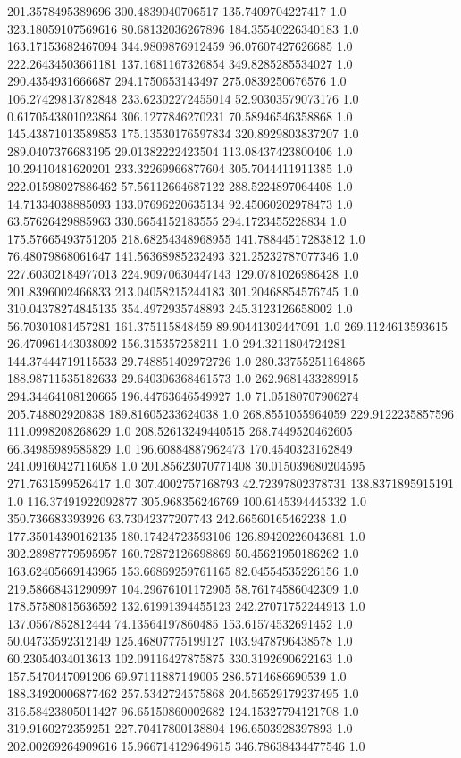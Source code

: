 201.3578495389696	300.4839040706517	135.7409704227417	1.0
323.18059107569616	80.68132036267896	184.35540226340183	1.0
163.17153682467094	344.9809876912459	96.07607427626685	1.0
222.26434503661181	137.1681167326854	349.8285285534027	1.0
290.4354931666687	294.1750653143497	275.0839250676576	1.0
106.27429813782848	233.62302272455014	52.90303579073176	1.0
0.6170543801023864	306.1277846270231	70.58946546358868	1.0
145.43871013589853	175.13530176597834	320.8929803837207	1.0
289.0407376683195	29.01382222423504	113.08437423800406	1.0
10.29410481620201	233.32269966877604	305.7044411911385	1.0
222.01598027886462	57.56112664687122	288.5224897064408	1.0
14.71334038885093	133.07696220635134	92.45060202978473	1.0
63.57626429885963	330.6654152183555	294.1723455228834	1.0
175.57665493751205	218.68254348968955	141.78844517283812	1.0
76.48079868061647	141.56368985232493	321.25232787077346	1.0
227.60302184977013	224.90970630447143	129.0781026986428	1.0
201.8396002466833	213.04058215244183	301.20468854576745	1.0
310.04378274845135	354.4972935748893	245.3123126658002	1.0
56.70301081457281	161.375115848459	89.90441302447091	1.0
269.1124613593615	26.470961443038092	156.315357258211	1.0
294.3211804724281	144.37444719115533	29.748851402972726	1.0
280.33755251164865	188.98711535182633	29.640306368461573	1.0
262.9681433289915	294.34464108120665	196.44763646549927	1.0
71.05180707906274	205.748802920838	189.81605233624038	1.0
268.8551055964059	229.9122235857596	111.0998208268629	1.0
208.52613249440515	268.7449520462605	66.34985989585829	1.0
196.60884887962473	170.4540323162849	241.09160427116058	1.0
201.85623070771408	30.015039680204595	271.7631599526417	1.0
307.4002757168793	42.72397802378731	138.8371895915191	1.0
116.37491922092877	305.968356246769	100.6145394445332	1.0
350.736683393926	63.73042377207743	242.66560165462238	1.0
177.35014390162135	180.17424723593106	126.89420226043681	1.0
302.28987779595957	160.72872126698869	50.45621950186262	1.0
163.62405669143965	153.66869259761165	82.04554535226156	1.0
219.58668431290997	104.29676101172905	58.76174586042309	1.0
178.57580815636592	132.61991394455123	242.27071752244913	1.0
137.0567852812444	74.13564197860485	153.61574532691452	1.0
50.04733592312149	125.46807775199127	103.9478796438578	1.0
60.23054034013613	102.09116427875875	330.3192690622163	1.0
157.5470447091206	69.97111887149005	286.5714686690539	1.0
188.34920006877462	257.5342724575868	204.56529179237495	1.0
316.58423805011427	96.65150860002682	124.15327794121708	1.0
319.9160272359251	227.70417800138804	196.6503928397893	1.0
202.00269264909616	15.966714129649615	346.78638434477546	1.0
